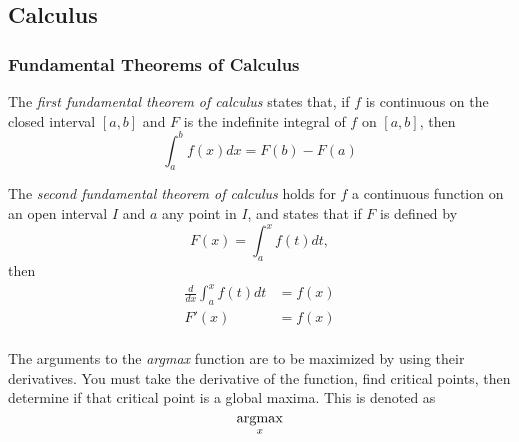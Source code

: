 \subsection{Calculus} \label{app:Calculus}
	\subsubsection{Fundamental Theorems of Calculus} \label{subsubsec:Fundamental Theorem of Calculus}
		\begin{definition} \label{def:1st Fundamental Theorem of Calculus}
			The \emph{first fundamental theorem of calculus} states that, if $f$ is continuous on the closed interval $\left[ a,b \right]$ and $F$ is the indefinite integral of $f$ on $\left[ a,b \right]$, then 
			\begin{equation} \label{eq:1st Fundamental Theorem of Calculus}
				\int_{a}^{b}f \left( x \right) dx = F \left( b \right) - F \left( a \right)
			\end{equation}
		\end{definition}
		\begin{definition} \label{def:2nd Fundamental Theorem of Calculus}
			The \emph{second fundamental theorem of calculus} holds for $f$ a continuous function on an open interval $I$ and $a$ any point in $I$, and states that if $F$ is defined by
			\begin{equation*}
				F \left( x \right) = \int_{a}^{x} f \left( t \right) dt,
			\end{equation*}
			then
			\begin{equation} \label{eq:2nd Fundamental Theorem of Calculus}
				\begin{aligned}
					\frac{d}{dx} \int_{a}^{x} f \left( t \right) dt &= f \left( x \right) \\
					F' \left( x \right) &= f \left( x \right) \\
				\end{aligned}
			\end{equation}
		\end{definition}
	
	\begin{definition}[argmax] \label{def:argmax}
		The arguments to the \emph{argmax} function are to be maximized by using their derivatives.
		You must take the derivative of the function, find critical points, then determine if that critical point is a global maxima.
		This is denoted as
		\begin{equation*} \label{eq:argmax}
			\operatorname*{argmax}_{x}
		\end{equation*}
	\end{definition}